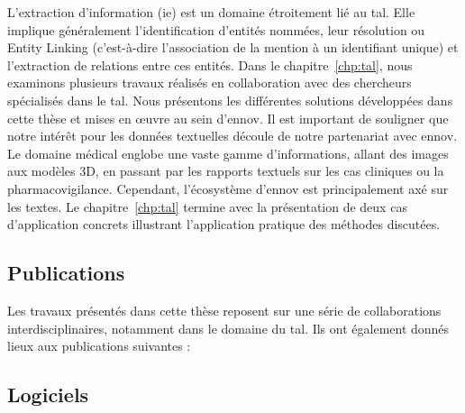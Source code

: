 \begin{description}
    L'extraction d'information (\acrshort{ie}) est un domaine étroitement lié au \gls{tal}.
    Elle implique généralement l'identification d'entités nommées, leur résolution ou Entity Linking (c'est-à-dire l'association de la mention à un identifiant unique) et l'extraction de relations entre ces entités.
    Dans le chapitre~\ref{chp:tal}, nous examinons plusieurs travaux réalisés en collaboration avec des chercheurs spécialisés dans le \gls{tal}.
    Nous présentons les différentes solutions développées dans cette thèse et mises en œuvre au sein d'\gls{ennov}.
    Il est important de souligner que notre intérêt pour les données textuelles découle de notre partenariat avec \gls{ennov}.
    Le domaine médical englobe une vaste gamme d'informations, allant des images aux modèles 3D, en passant par les rapports textuels sur les cas cliniques ou la pharmacovigilance.
    Cependant, l'écosystème d'\gls{ennov} est principalement axé sur les textes.
    Le chapitre~\ref{chp:tal} termine avec la présentation de deux cas d'application concrets illustrant l'application pratique des méthodes discutées.
\end{description}

\subsection{Publications}

Les travaux présentés dans cette thèse reposent sur une série de collaborations interdisciplinaires, notamment dans le domaine du \gls{tal}.
Ils ont également donnés lieux aux publications suivantes :

\begin{bibunit}[alphaurl]
    \nocite{amaviNaturalLanguageQuerying2020}
    \nocite{chabinGraphRewritingRules2020}
    \nocite{minardDOINGDEFTCascade2020}
    \nocite{chabinGraphRewritingRules2021}
    \nocite{hiotDOINGDEFTUtilisation2021}
    \nocite{savaryRelationExtractionClinical2022}
    \nocite{chabinManagingLinkedNulls2023}

    \renewcommand{\bibname}{}
    \renewcommand{\section}[1]{}
\end{bibunit}

\subsection{Logiciels}

